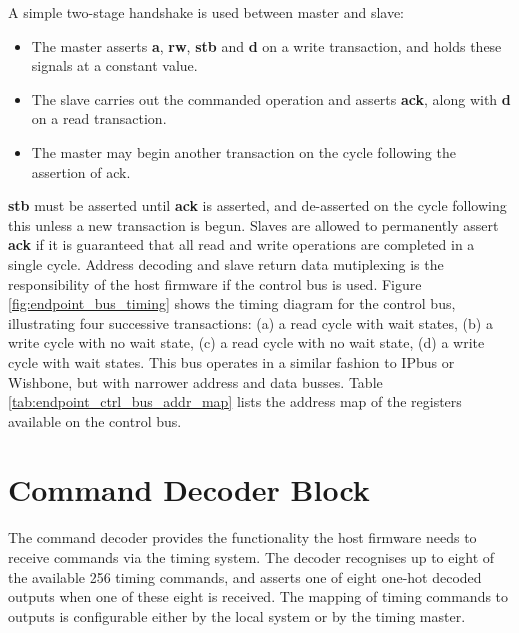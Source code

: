\documentclass[fleqn,12pt,a4paper]{olplainarticle}
\begin{document}
A simple two-stage handshake is used between master and slave:

\begin{itemize}
\item The master asserts \textbf{a}, \textbf{rw}, \textbf{stb} and \textbf{d} on a write transaction, and holds these signals at a constant value.
\item The slave carries out the commanded operation and asserts \textbf{ack}, along with \textbf{d} on a read transaction.
\item The master may begin another transaction on the cycle following the assertion of ack.
\end{itemize}

\textbf{stb} must be asserted until \textbf{ack} is asserted, and de-asserted on the cycle following this unless a new transaction is begun. Slaves are allowed to permanently assert \textbf{ack} if it is guaranteed that all read and write operations are completed in a single cycle. Address decoding and slave return data mutiplexing is the responsibility of the host firmware if the control bus is used. Figure \ref{fig:endpoint_bus_timing} shows the timing diagram for the control bus, illustrating four successive transactions: (a) a read cycle with wait states, (b) a write cycle with no wait state, (c) a read cycle with no wait state, (d) a write cycle with wait states. This bus operates in a similar fashion to IPbus or Wishbone, but with narrower address and data busses. Table \ref{tab:endpoint_ctrl_bus_addr_map} lists the address map of the registers available on the control bus.


\section{Command Decoder Block}

The command decoder provides the functionality the host firmware needs to receive commands via the timing system. The decoder recognises up to eight of the available 256 timing commands, and asserts one of eight one-hot decoded outputs when one of these eight is received. The mapping of timing commands to outputs is configurable either by the local system or by the timing master.
\end{document}
